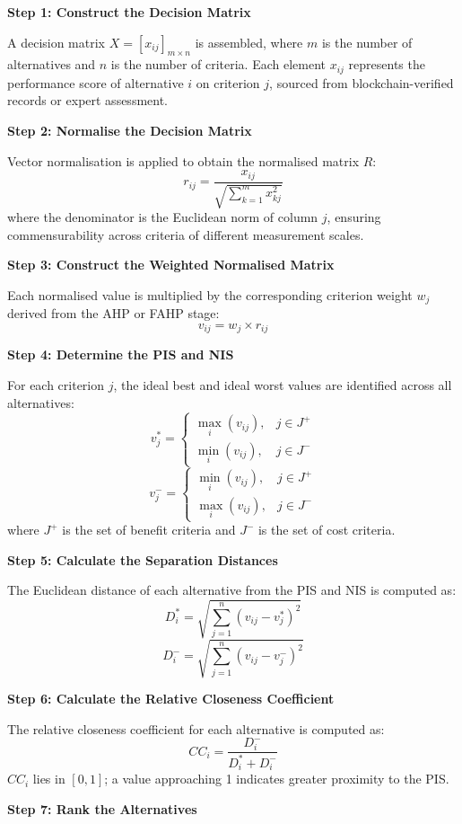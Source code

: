 \documentclass[11pt]{article}
\newcommand{\stepheading}[1]{%
\par\vspace{0.75\baselineskip}%
\noindent\textbf{#1}\par
\vspace{0.25\baselineskip}%
}
\begin{document}
\stepheading{Step 1: Construct the Decision Matrix}

A decision matrix $X=[x_{ij}]_{m\times n}$ is assembled, where $m$ is the number of alternatives and $n$ is the number of criteria. Each element $x_{ij}$ represents the performance score of alternative $i$ on criterion $j$, sourced from blockchain-verified records or expert assessment.

\stepheading{Step 2: Normalise the Decision Matrix}

Vector normalisation is applied to obtain the normalised matrix $R$:
\[
r_{ij}=\frac{x_{ij}}{\sqrt{\sum_{k=1}^{m}x_{kj}^{2}}}
\]
where the denominator is the Euclidean norm of column $j$, ensuring commensurability across criteria of different measurement scales.

\stepheading{Step 3: Construct the Weighted Normalised Matrix}

Each normalised value is multiplied by the corresponding criterion weight $w_j$ derived from the AHP or FAHP stage:
\[
v_{ij}=w_j\times r_{ij}
\]

\stepheading{Step 4: Determine the PIS and NIS}

For each criterion $j$, the ideal best and ideal worst values are identified across all alternatives:
\[
v_j^*=\begin{cases}
\max_i(v_{ij}), & j\in J^+ \\
\min_i(v_{ij}), & j\in J^-
\end{cases}
\]
\[
v_j^-=\begin{cases}
\min_i(v_{ij}), & j\in J^+ \\
\max_i(v_{ij}), & j\in J^-
\end{cases}
\]
where $J^+$ is the set of benefit criteria and $J^-$ is the set of cost criteria.

\stepheading{Step 5: Calculate the Separation Distances}

The Euclidean distance of each alternative from the PIS and NIS is computed as:
\[
D_i^*=\sqrt{\sum_{j=1}^{n}(v_{ij}-v_j^*)^2}
\]
\[
D_i^-=\sqrt{\sum_{j=1}^{n}(v_{ij}-v_j^-)^2}
\]

\stepheading{Step 6: Calculate the Relative Closeness Coefficient}

The relative closeness coefficient for each alternative is computed as:
\[
CC_i=\frac{D_i^-}{D_i^*+D_i^-}
\]
$CC_i$ lies in $[0,1]$; a value approaching 1 indicates greater proximity to the PIS.

\stepheading{Step 7: Rank the Alternatives}
\end{document}
